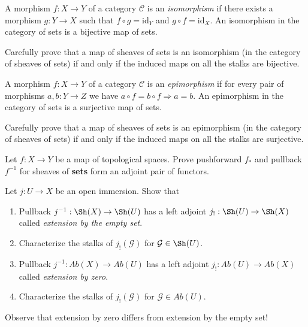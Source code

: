 \noindent
A morphism $f : X \to Y$ of a category $\mathcal{C}$ is an {\it isomorphism}
if there exists a morphism $g : Y \to X$ such that $f \circ g = \text{id}_Y$
and $g \circ f = \text{id}_X$. An isomorphism in the category of sets
is a bijective map of sets.

\begin{exercise}
\label{exercise-isomorphism-sheaves-sets}
Carefully prove that a map of sheaves of sets is an isomorphism
(in the category of sheaves of sets) if and only if the induced maps on
all the stalks are bijective.
\end{exercise}

\noindent
A morphism $f : X \to Y$ of a category $\mathcal{C}$ is an {\it epimorphism}
if for every pair of morphisms $a, b : Y \to Z$ we have
$a \circ f = b \circ f \Rightarrow a = b$. An epimorphism in the
category of sets is a surjective map of sets.

\begin{exercise}
\label{exercise-epi-sheaves-sets}
Carefully prove that a map of sheaves of sets is an epimorphism
(in the category of sheaves of sets) if and only if the induced maps on
all the stalks are surjective.
\end{exercise}

\begin{exercise}
\label{exercise-adjoint-push-pull}
Let $f : X \to Y$ be a map of topological spaces.
Prove pushforward $f_\ast$ and pullback $f^{-1}$ for sheaves of {\bf sets}
form an adjoint pair of functors.
\end{exercise}

\begin{exercise}
\label{exercise-j-shriek}
Let $j : U \to X$ be an open immersion. Show that
\begin{enumerate}
\item Pullback $j^{-1} : \Sh(X) \to \Sh(U)$ has a left adjoint
$j_{!} : \Sh(U) \to \Sh(X)$ called {\it extension by the empty set}.
\item Characterize the stalks of $j_{!}({\mathcal G})$ for
$\mathcal{G} \in \Sh(U)$.
\item Pullback $j^{-1} : \textit{Ab}(X) \to \textit{Ab}(U)$ has a left adjoint
$j_{!} : \textit{Ab}(U) \to \textit{Ab}(X)$ called {\it extension by zero}.
\item Characterize the stalks of $j_{!}({\mathcal G})$ for
$\mathcal{G} \in \textit{Ab}(U)$.
\end{enumerate}
Observe that extension by zero differs from extension by the
empty set!
\end{exercise}

